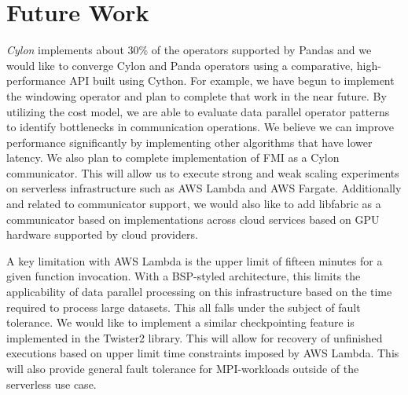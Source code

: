 \section{Future Work}
\label{sec:future}
\textit{Cylon} implements about 30\% of the operators supported by Pandas and we would like to converge Cylon and Panda operators using a comparative, high-performance API built using Cython.  For example, we have begun to implement the windowing operator and plan to complete that work in the near future.  By utilizing the cost model,  we are able to evaluate data parallel operator patterns to identify bottlenecks in communication operations.  We believe we can improve performance significantly by implementing other algorithms that have lower latency\cite{perera2023depth}.  We also plan to complete implementation of FMI as a Cylon communicator.  This will allow us to execute strong and weak scaling experiments on serverless infrastructure such as AWS Lambda and AWS Fargate.  Additionally and related to communicator support, we would also like to add libfabric as a communicator based on implementations across cloud services based on GPU hardware supported by cloud providers.

A key limitation with AWS Lambda is the upper limit of fifteen minutes for a given function invocation.  With a BSP-styled architecture, this limits the applicability of data parallel processing on this infrastructure based on the time required to process large datasets.  This all falls under the subject of fault tolerance.  We would like to implement a similar checkpointing feature is implemented in the Twister2 library.  This will allow for recovery of unfinished executions based on upper limit time constraints imposed by AWS Lambda.  This will also provide general fault tolerance for MPI-workloads outside of the serverless use case.







